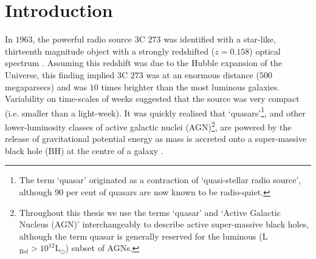 
\chapter{Introduction}
\label{ch:intro}




In $1963$, the powerful radio source $3$C $273$ was identified with a star-like, thirteenth magnitude object with a strongly redshifted ($z=0.158$)  optical spectrum \citep{schmidt63}. 
Assuming this redshift was due to the Hubble expansion of the Universe, this finding implied $3$C $273$ was at an enormous distance ($500$ megaparsecs) and was $10$ times brighter than the most luminous galaxies. 
Variability on time-scales of weeks suggested that the source was very compact (i.e. smaller than a light-week).
It was quickly realised that `quasars'\footnote{The term `quasar' originated as a contraction of `quasi-stellar radio source', although 90 per cent of quasars are now known to be radio-quiet.}, and other lower-luminosity classes of active galactic nuclei (AGN)\footnote{Throughout this thesis we use the terms `quasar' and `Active Galactic Nucleus (AGN)' interchangeably to describe active super-massive black holes, although the term quasar is generally reserved for the luminous (L$_{\mathrm Bol} > 10^{12}{\mathrm L}_{\odot}$) subset of AGNs.}, are powered by the release of gravitational potential energy as mass is accreted onto a super-massive  black hole (BH) at the centre of a galaxy \citep[e.g.][]{hoyle63,salpeter64,lynden-bell69,lynden-bell71}. 

